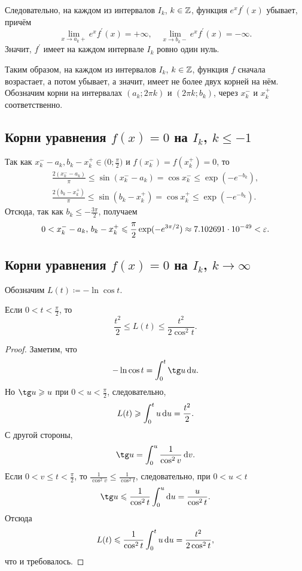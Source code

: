 \documentclass[a5paper, leqno, 10pt]{article}
\begin{document}
Следовательно, на каждом из интервалов $I_k$, $k \in \mathbb{Z}$, функция $e^xf^{\prime}(x)$ убывает, причём
\[
	\lim_{x \to a_k +}e^xf^{\prime}(x) = +\infty,\quad \lim_{x \to b_k -}e^xf^{\prime}(x) = -\infty.
\]
Значит, $f^{\prime}$ имеет на каждом интервале $I_k$ ровно один нуль.

Таким образом, на каждом из интервалов $I_k$, $k \in \mathbb{Z}$, функция $f$ сначала возрастает, а потом убывает, а значит, имеет не более двух корней на нём. Обозначим корни на интервалах $(a_k; 2\pi k)$ и $(2\pi k; b_k)$, через $x_k^{-}$ и $x_k^{+}$ соответственно.

\subsection{Корни уравнения $f(x) = 0$ на $I_k$, $k \leqslant -1$}

Так как $x_k^{-} - a_k, b_k - x_k^{+} \in \big(0; \frac{\pi}{2}\big)$ и $f(x_k^{-}) = f(x_k^{+}) = 0$, то
\begin{gather*}
	\frac{2(x_k^{-} - a_k)}{\pi} \leqslant \sin(x_k^{-} - a_k) = \cos x_k^{-} \leqslant \exp(-e^{-b_k}),\\
	\frac{2(b_k - x_k^{+})}{\pi} \leqslant \sin(b_k - x_k^{+}) = \cos x_k^{+} \leqslant \exp(-e^{-b_k}).
\end{gather*}
Отсюда, так как $b_k \leqslant -\frac{3\pi}{2}$, получаем
\begin{equation} \label{eq:negative_estimates}
	0 < x_k^{-} - a_k,\,b_k - x_k^{+} \leqslant \frac{\pi}{2}\exp(-e^{3\pi / 2}) \approx 7{.}102691 \cdot 10^{-49} < \varepsilon.
\end{equation}

\subsection{Корни уравнения $f(x) = 0$ на $I_k$, $k \to \infty$}

Обозначим $L(t) \coloneqq -\ln\cos t$.

\begin{lemma}
	Если $0 < t < \frac{\pi}{2}$, то
	\begin{equation} \label{eq:L_estimates}
		\frac{t^2}{2} \leqslant L(t) \leqslant \frac{t^2}{2\cos^2t}.
	\end{equation}
\end{lemma}

\begin{proof}
	Заметим, что
	\[
		-\ln\cos t = \int_0^t\tg u\diff u.
	\]
	Но $\tg u \geqslant u$ при $0 < u < \frac{\pi}{2}$, следовательно,
	\[
		L(t) \geqslant \int_0^tu\mathop{}\!\mathrm{d} u = \frac{t^2}{2}.
	\]
	С другой стороны,
	\[
		\tg u = \int_0^u\frac{1}{\cos^2v}\diff v.
	\]
	Если $0 < v \leqslant t < \frac{\pi}{2}$, то $\frac{1}{\cos^2v} \leqslant \frac{1}{\cos^2t}$, следовательно, при $0 < u < t$
	\[
		\tg u \leqslant \frac{1}{\cos^2t}\int_0^u\diff u = \frac{u}{\cos^2t}.
	\]
	Отсюда
	\[
		L(t) \leqslant \frac{1}{\cos^2 t}\int_0^tu\mathop{}\!\mathrm{d} u = \frac{t^2}{2\cos^2t},
	\]
	что и требовалось.
\end{proof}
\end{document}
